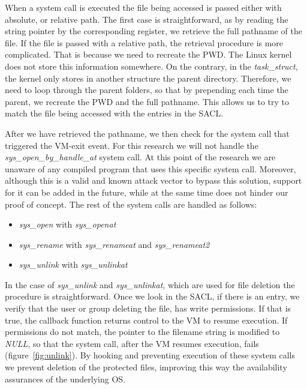 \par When a system call is executed the file being accessed is passed either with absolute, or relative path. The first case is straightforward, as by reading the string pointer by the corresponding register, we retrieve the full pathname of the file. If the file is passed with a relative path, the retrieval procedure is more complicated. That is because we need to recreate the \ac{PWD}. The Linux kernel does not store this information somewhere. On the contrary, in the \textit{task\_struct}, the kernel only stores in another structure the parent directory. Therefore, we need to loop through the parent folders, so that by prepending each time the parent, we recreate the \ac{PWD} and the full pathname. This allows us to try to match the file being accessed with the entries in the \ac{SACL}.

\par After we have retrieved the pathname, we then check for the system call that triggered the VM-exit event. For this research we will not handle the \textit{sys\_open\_by\_handle\_at} system call. At this point of the research we are unaware of any compiled program that uses this specific system call. Moreover, although this is a valid and known attack vector to bypass this solution, support for it can be added in the future, while at the same time does not hinder our proof of concept. The rest of the system calls are handled as follows: 
\begin{itemize}
\item \textit{sys\_open} with \textit{sys\_openat}
\item \textit{sys\_rename} with \textit{sys\_renameat} and \textit{sys\_renameat2}
\item \textit{sys\_unlink} with \textit{sys\_unlinkat}
\end{itemize}

\par In the case of \textit{sys\_unlink} and \textit{sys\_unlinkat}, which are used for file deletion the procedure is straightforward. Once we look in the \ac{SACL}, if there is an entry, we verify that the user or group deleting the file, has write permissions. If that is true, the callback function returns control to the \ac{VM} to resume execution. If permissions do not match, the pointer to the filename string is modified to \textit{NULL}, so that the system call, after the \ac{VM} resumes execution, fails (figure~\ref{fig:unlink}). By hooking and preventing execution of these system calls we prevent deletion of the protected files, improving this way the availability assurances of the underlying \ac{OS}.

